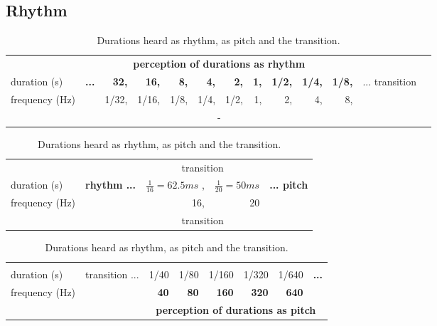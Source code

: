 \subsection{Rhythm}\label{subsec:ritmo}
\begin{table}[htp!]
\caption{Durations heard as rhythm, as pitch and the transition.}
\begin{tabular}{  l | r r r r   r r r    r r r || r r  } \hline
& \multicolumn{10}{c}{\bf perception of durations as rhythm} & \multicolumn{2}{c}{}  \\
	duration (s) & \multirow{2}{*}{\bf ...}     & {\bf 32,}     & {\bf 16,}   & {\bf 8,}  & {\bf 4,}   & {\bf 2,}   & {\bf 1,}   & {\bf 1/2,} & {\bf 1/4,} & {\bf 1/8,} & \multirow{2}{*}{ ... transition } & \\
frequency (Hz) & & {\color{gray} 1/32,}   & {\color{gray} 1/16,} & {\color{gray} 1/8,} & {\color{gray} 1/4,} & {\color{gray} 1/2,} &  {\color{gray} 1,}  & {\color{gray} 2,}   & {\color{gray} 4,}   & {\color{gray} 8,} & & \\
& \multicolumn{10}{c}{ - } & \multicolumn{2}{c}{} \\ \hline
\end{tabular}
\vspace{.2cm}

	\begin{tabular}{  l | p{1.7cm}  || r r || r } \hline
& \multicolumn{1}{c}{} & \multicolumn{2}{c}{transition} &  \\
duration (s) & \multirow{2}{*}{\bf rhythm ...} & $\frac{1}{16}=62.5ms$ , & $\frac{1}{20}=50ms$ & \multirow{2}{*}{\bf ... pitch} \\
frequency (Hz) & & 16, & 20 &  \\
& \multicolumn{1}{c}{} & \multicolumn{2}{c}{transition} & \\ \hline
\end{tabular}
\hspace{3.36cm}
\vspace{.2cm}

	\begin{tabular}{  l | p{1.7cm} || r r r r r r }\hline
& \multicolumn{1}{c}{} &  \\
	duration (s) & \multirow{2}{*}{transition ...} & {\color{gray} 1/40} & {\color{gray} 1/80  } & {\color{gray} 1/160 } & {\color{gray} 1/320 } & {\color{gray} 1/640 } & \multirow{2}{*}{\bf ... } \\
frequency (Hz) & & {\bf 40}   & {\bf 80}   & {\bf 160}   & {\bf 320}   & {\bf 640}   & \\
& \multicolumn{1}{c}{} & \multicolumn{6}{c}{\bf perception of durations as pitch} \\ \hline
\end{tabular}
\hspace{2.70cm}
\label{tab:duracoes}
\end{table}

